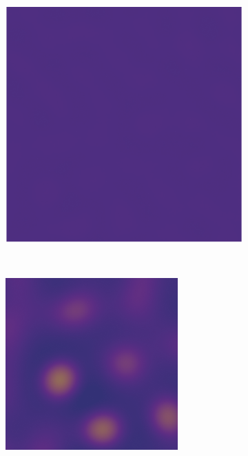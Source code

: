 \documentclass[showkeys, prb, reprint]{revtex4-1}
\begin{document}
\begin{figure}
    \centering
    \begin{subfigure}[b]{0.3\columnwidth}
        \includegraphics[width=\textwidth]{initial}
        \label{fig:initial}
        \caption{}
    \end{subfigure}
    ~
    \begin{subfigure}[b]{0.3\columnwidth}
        \includegraphics[width=\textwidth]{early_spinodal}

\end{subfigure}
\end{figure}
\end{document}
